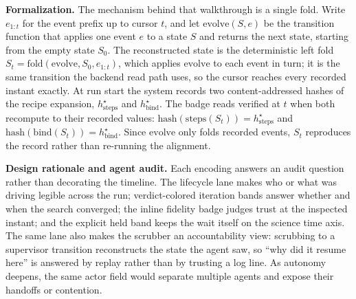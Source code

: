 \textbf{Formalization.} The mechanism behind that walkthrough is a single fold.
Write $e_{1{:}t}$ for the event prefix up to cursor $t$, and let
$\mathrm{evolve}(S, e)$ be the transition function that applies one event $e$ to a
state $S$ and returns the next state, starting from the empty state $S_0$.
The reconstructed state is the deterministic left fold $S_t =
\mathrm{fold}(\mathrm{evolve}, S_0, e_{1{:}t})$, which applies $\mathrm{evolve}$
to each event in turn; it is the same transition the backend read path uses, so
the cursor reaches every recorded instant exactly.
At run start the system records two content-addressed hashes of the recipe
expansion, $h^{\star}_{\mathrm{steps}}$ and $h^{\star}_{\mathrm{bind}}$. The badge
reads verified at $t$ when both recompute to their recorded values:
$\mathrm{hash}(\mathrm{steps}(S_t)) = h^{\star}_{\mathrm{steps}}$ and
$\mathrm{hash}(\mathrm{bind}(S_t)) = h^{\star}_{\mathrm{bind}}$. Since
$\mathrm{evolve}$ only folds recorded events, $S_t$ reproduces the record rather
than re-running the alignment.

\textbf{Design rationale and agent audit.} Each encoding answers an audit
question rather than decorating the timeline. The lifecycle lane makes who or
what was driving legible across the run; verdict-colored iteration bands answer
whether and when the search converged; the inline fidelity badge judges trust at
the inspected instant; and the explicit held band keeps the wait itself on the
science time axis. The same lane also makes the scrubber an accountability view:
scrubbing to a supervisor transition reconstructs the state the agent saw, so
``why did it resume here'' is answered by replay rather than by trusting a log
line. As autonomy deepens, the same actor field would separate multiple agents
and expose their handoffs or contention.
